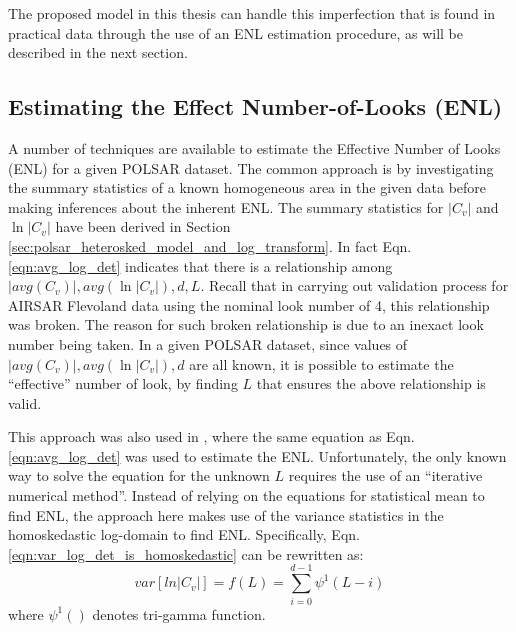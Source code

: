 The proposed model in this thesis can handle this imperfection that is found in practical data through the use of an ENL estimation procedure, as will be described in the next section.
  
\subsection{Estimating the Effect Number-of-Looks (ENL)}

A number of techniques are available to estimate the Effective Number of Looks (ENL) for a given POLSAR dataset.
The common approach is by investigating the summary statistics of a known homogeneous area in the given data
  before making inferences about the inherent ENL.
The summary statistics for $|C_v|$ and $\ln|C_v|$ have been derived in Section \ref{sec:polsar_heterosked_model_and_log_transform}.
In fact Eqn. \ref{eqn:avg_log_det} indicates that there is a relationship among $|avg(C_v)|,avg(\ln|C_v|),d,L$.
Recall that in carrying out validation process for AIRSAR Flevoland data using the nominal look number of 4, this relationship was broken.
The reason for such broken relationship is due to an inexact look number being taken.
In a given POLSAR dataset, since values of $|avg(C_v)|,avg(\ln|C_v|),d$ are all known,
  it is possible to estimate the ``effective'' number of look, by finding $L$ that ensures the above relationship is valid.

This approach was also used in \cite{Anfinsen_2009_TGRS_3795}, where the same equation 
  as Eqn.  \ref{eqn:avg_log_det} was used to estimate the ENL.
Unfortunately, the only known way to solve the equation for the unknown $L$ requires the use of an ``iterative numerical method''.
Instead of relying on the equations for statistical mean to find ENL,
  the approach here makes use of the variance statistics in the homoskedastic log-domain to find ENL.
Specifically, Eqn. \ref{eqn:var_log_det_is_homoskedastic} can be rewritten as: 
\begin{equation*}
  var \left[ ln|C_v| \right] = f(L) = \sum^{d-1}_{i=0} \psi^1(L-i)
\end{equation*}
where $\psi^1()$ denotes tri-gamma function.

